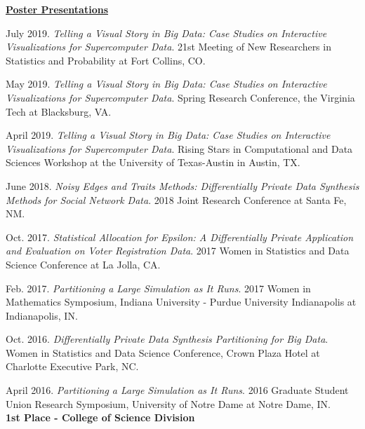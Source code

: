 \documentclass[11pt, letterpaper, roman]{moderncv} %
\begin{document}
\begin{etaremune}[topsep=0pt, itemsep=5pt, partopsep=0pt, parsep=0pt]

\vspace{5pt}

\hspace{-0.30in}\underline{\textbf{\large Poster Presentations}}\normalsize
  \item July 2019. \textit{Telling a Visual Story in Big Data: Case Studies on Interactive Visualizations for Supercomputer Data}. 21st Meeting of New Researchers in Statistics and Probability at Fort Collins, CO.

  \item May 2019. \textit{Telling a Visual Story in Big Data: Case Studies on Interactive Visualizations for Supercomputer Data}. Spring Research Conference, the Virginia Tech at Blacksburg, VA.

  \item April 2019. \textit{Telling a Visual Story in Big Data: Case Studies on Interactive Visualizations for Supercomputer Data}. Rising Stars in Computational and Data Sciences Workshop at the University of Texas-Austin in Austin, TX.
  
  \item June 2018. \textit{Noisy Edges and Traits Methods: Differentially Private Data Synthesis Methods for Social Network Data}. 2018 Joint Research Conference at Santa Fe, NM.
  
  \item Oct. 2017. \textit{Statistical Allocation for Epsilon: A Differentially Private Application and Evaluation on Voter Registration Data}. 2017 Women in Statistics and Data Science Conference at La Jolla, CA.
  
  \item Feb. 2017. \textit{Partitioning a Large Simulation as It Runs}. 2017 Women in Mathematics Symposium, Indiana University - Purdue University Indianapolis at Indianapolis, IN.

  \item Oct. 2016. \textit{Differentially Private Data Synthesis Partitioning for Big Data}. Women in Statistics and Data Science Conference, Crown Plaza Hotel at Charlotte Executive Park, NC. 

  \item April 2016. \textit{Partitioning a Large Simulation as It Runs}. 2016 Graduate Student Union Research Symposium, University of Notre Dame at Notre Dame, IN.\\
  \textbf{1st Place - College of Science Division}


\end{etaremune}
\end{document}
